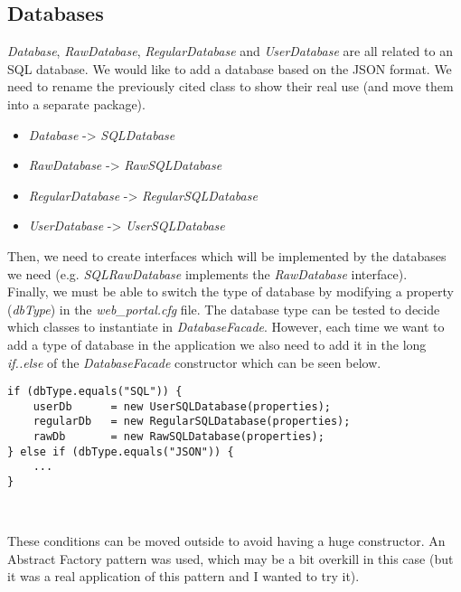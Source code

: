 \subsection{Databases}

\emph{Database}, \emph{RawDatabase}, \emph{RegularDatabase} and
\emph{UserDatabase} are all related to an SQL database. We would like to
add a database based on the JSON format. We need to rename the
previously cited class to show their real use (and move them into a
separate package).

\begin{itemize}
    \item \emph{Database} -> \emph{SQLDatabase}
    \item \emph{RawDatabase} -> \emph{RawSQLDatabase}
    \item \emph{RegularDatabase} -> \emph{RegularSQLDatabase}
    \item \emph{UserDatabase} -> \emph{UserSQLDatabase}
\end{itemize}

Then, we need to create interfaces which will be implemented by the databases we
need (e.g. \emph{SQLRawDatabase} implements the \emph{RawDatabase} interface).\\

Finally, we must be able to switch the type of database by modifying a property
(\emph{dbType}) in the \emph{web\_portal.cfg} file.
The database type can be tested to decide which classes to instantiate in
\emph{DatabaseFacade}. However, each time we want to add a type of
database in the application we also need to add it in the long \emph{if..else}
of the \emph{DatabaseFacade} constructor which can be seen below.

\begin{lstlisting}
if (dbType.equals("SQL")) {
	userDb		= new UserSQLDatabase(properties);
	regularDb	= new RegularSQLDatabase(properties);
	rawDb		= new RawSQLDatabase(properties);
} else if (dbType.equals("JSON")) {
    ...
}
\end{lstlisting}
\

These conditions can be moved outside to avoid having a huge constructor.
An Abstract Factory pattern was used, which may be a bit overkill in this case
(but it was a real application of this pattern and I wanted to try it).

